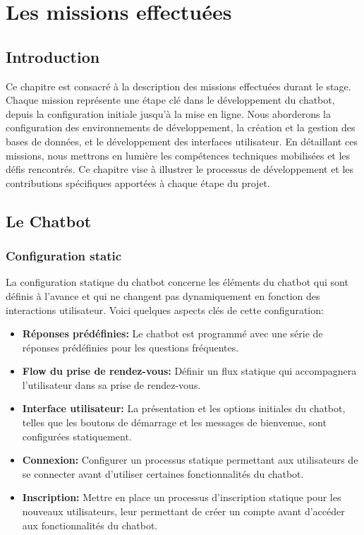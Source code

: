 \chapter{Les missions effectuées}
\label{chap:Chapter 4 title}
\section*{Introduction}

\hspace{16pt}Ce chapitre est consacré à la description des missions effectuées durant le stage. Chaque mission représente une étape clé dans le développement du chatbot, depuis la configuration initiale jusqu'à la mise en ligne. Nous aborderons la configuration des environnements de développement, la création et la gestion des bases de données, et le développement des interfaces utilisateur. En détaillant ces missions, nous mettrons en lumière les compétences techniques mobilisées et les défis rencontrés. Ce chapitre vise à illustrer le processus de développement et les contributions spécifiques apportées à chaque étape du projet.

\pagebreak

\section{Le Chatbot}

\subsection{Configuration static}

\hspace{16pt}La configuration statique du chatbot concerne les éléments du chatbot qui sont définis à l'avance et qui ne changent pas dynamiquement en fonction des interactions utilisateur. Voici quelques aspects clés de cette configuration:

\begin{itemize}
  \item \textbf{Réponses prédéfinies: }Le chatbot est programmé avec une série de réponses prédéfinies pour les questions fréquentes.
  \item \textbf{Flow du prise de rendez-vous: }Définir un flux statique qui accompagnera l'utilisateur dans sa prise de rendez-vous.
  \item \textbf{Interface utilisateur: }La présentation et les options initiales du chatbot, telles que les boutons de démarrage et les messages de bienvenue, sont configurées statiquement.
  \item \textbf{Connexion: }Configurer un processus statique permettant aux utilisateurs de se connecter avant d'utiliser certaines fonctionnalités du chatbot.
  \item \textbf{Inscription: }Mettre en place un processus d'inscription statique pour les nouveaux utilisateurs, leur permettant de créer un compte avant d'accéder aux fonctionnalités du chatbot.
\end{itemize}

